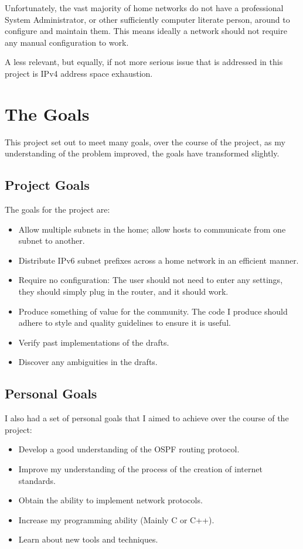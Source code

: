 \documentclass[12pt]{report}
\begin{document}
Unfortunately, the vast majority of home networks do not have a professional
System Administrator, or other sufficiently computer literate person, around to
configure and maintain them. This means ideally a network should not require any
manual configuration to work.

A less relevant, but equally, if not more serious issue that is addressed in
this project is IPv4  address
space exhaustion. 

\section{The Goals}
This project set out to meet many goals, over the course of the project, as my
understanding of the problem improved, the goals have transformed slightly.

\subsection{Project Goals}
The goals for the project are:

\begin{itemize}
\item Allow multiple subnets in the home; allow hosts to communicate from one
  subnet to another.
\item Distribute IPv6 subnet prefixes across a home network in an efficient
	manner. 
\item Require no configuration: The user should not need to enter any settings,
  they should simply plug in the router, and it should work.
\item Produce something of value for the community. The code I produce should
  adhere to style and quality guidelines to ensure it is useful.
\item Verify past implementations of the drafts.
\item Discover any ambiguities in the drafts.
\end{itemize}

\subsection{Personal Goals}
I also had a set of personal goals that I aimed to achieve over the course of
the project:
\begin{itemize}
	\item Develop a good understanding of the OSPF routing protocol.
	\item Improve my understanding of the process of the creation of internet
		standards.
	\item Obtain the ability to implement network protocols.
	\item Increase my programming ability (Mainly C or C++).
	\item Learn about new tools and techniques.
\end{itemize}
\end{document}
